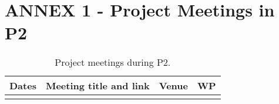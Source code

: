%

\section{ANNEX 1 - Project Meetings in P2}

\begin{table}[H]
\caption{Project meetings during P2.}
\centering
\begin{tabularx}{\textwidth}{|c|X|X|c|} \hline
    \rowcolor{mycyan}
    {\bf Dates} & {\bf Meeting title and link} &
    {\bf Venue} & {\bf WP} \\ \hline
     & & & \\ \hline 
\end{tabularx}
\label{tab:project-meetings}
\end{table}